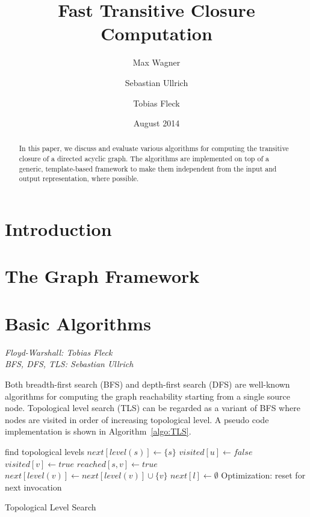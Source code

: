 \documentclass[12pt,a4paper,twoside]{article}
\begin{document}
\title{Fast Transitive Closure Computation}
\author{Max Wagner \and Sebastian Ullrich \and Tobias Fleck}
\date{August 2014}
\maketitle

\def\sectionautorefname{Section}
\def\subsectionautorefname{Subsection}

\newcommand\ie{i.e.\ }
\newcommand\eg{e.g.\ }
\newcommand\credits[1]{\begin{flushright}\emph{#1}\end{flushright}}

\begin{abstract}
  In this paper, we discuss and evaluate various algorithms for computing the transitive closure of a directed acyclic graph. The algorithms are implemented on top of a generic, template-based framework to make them independent from the input and output representation, where possible.
\end{abstract}

\section{Introduction}

\section{The Graph Framework}

\section{Basic Algorithms}
\credits{Floyd-Warshall: Tobias Fleck \\ BFS, DFS, TLS: Sebastian Ullrich}

Both breadth-first search (BFS) and depth-first search (DFS) are well-known algorithms for computing the graph reachability starting from a single source node. Topological level search (TLS) can be regarded as a variant of BFS where nodes are visited in order of increasing topological level. A pseudo code implementation is shown in Algorithm~\ref{algo:TLS}.

\begin{algorithm}
  \begin{algorithmic}
      \State find topological levels
      \State $next[level(s)] \gets \{s\}$
          \State $visited[u] \gets false$
              \State $visited[v] \gets true$
              \State $reached[s, v] \gets true$
              \State $next[level(v)] \gets next[level(v)] \cup \{v\}$
            \EndIf
          \EndFor
        \EndFor
        \State $next[l] \gets \emptyset$ \Comment Optimization: reset for next invocation
      \EndFor
    \EndFunction
  \end{algorithmic}
  \caption{Topological Level Search}
  \label{algo:TLS}
\end{algorithm}
\end{document}
